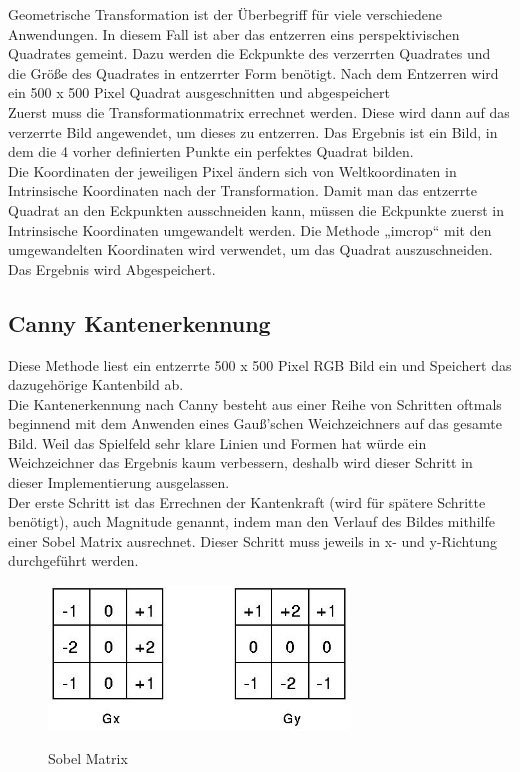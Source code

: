 \documentclass[paper=A4, deutsch]{scrartcl}
\begin{document}
Geometrische Transformation ist der Überbegriff für viele verschiedene Anwendungen. In diesem Fall ist aber das entzerren eins perspektivischen Quadrates gemeint. Dazu werden die Eckpunkte des verzerrten Quadrates und die Größe des Quadrates in entzerrter Form benötigt. Nach dem Entzerren wird ein 500 x 500 Pixel Quadrat ausgeschnitten und abgespeichert\\
Zuerst muss die Transformationmatrix errechnet werden. Diese wird dann auf das verzerrte Bild angewendet, um dieses zu entzerren. Das Ergebnis ist ein Bild, in dem die 4 vorher definierten Punkte ein perfektes Quadrat bilden.\\
Die Koordinaten der jeweiligen Pixel ändern sich von Weltkoordinaten in Intrinsische Koordinaten nach der Transformation. Damit man das entzerrte Quadrat an den Eckpunkten ausschneiden kann, müssen die Eckpunkte zuerst in Intrinsische Koordinaten umgewandelt werden. Die Methode „imcrop“ mit den umgewandelten Koordinaten wird verwendet, um das Quadrat auszuschneiden. Das Ergebnis wird Abgespeichert.\\

\subsection{Canny Kantenerkennung}
Diese Methode liest ein entzerrte 500 x 500 Pixel RGB Bild ein und Speichert das dazugehörige Kantenbild ab.\\
Die Kantenerkennung nach Canny besteht aus einer Reihe von Schritten oftmals beginnend mit dem Anwenden eines Gauß’schen Weichzeichners auf das gesamte Bild. Weil das Spielfeld sehr klare Linien und Formen hat würde ein Weichzeichner das Ergebnis kaum verbessern, deshalb wird dieser Schritt in dieser Implementierung ausgelassen.\\
Der erste Schritt ist das Errechnen der Kantenkraft (wird für spätere Schritte benötigt), auch Magnitude genannt, indem man den Verlauf des Bildes mithilfe einer Sobel Matrix ausrechnet. Dieser Schritt muss jeweils in x- und y-Richtung durchgeführt werden.\\ 

\begin{figure}[ht]
	\centering
		\includegraphics[width=8cm]{Sobel.png}\\
	\caption[Sobel Matrix]{Sobel Matrix}
	\label{fig:nettop}
\end{figure}
\end{document}
